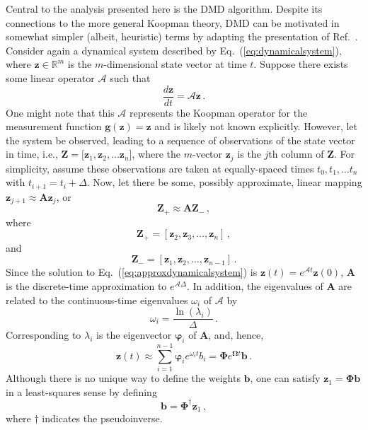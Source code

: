 \documentclass[review,number,sort&compress,12pt]{elsarticle}
\begin{document}
Central to the analysis presented here is the DMD algorithm.
Despite its connections to the more general Koopman theory, DMD can be motivated in somewhat simpler (albeit, heuristic) terms by adapting the presentation of Ref.~\cite{kutzbook}.
Consider again a dynamical system described by Eq.~(\ref{eq:dynamicalsystem}), where $\mathbf{z} \in \mathbb{R}^m$ is the $m$-dimensional state vector at time $t$.
Suppose there exists some linear operator $\mathcal{A}$ such that
\begin{equation}
 \frac{d \mathbf{z}}{dt} = \mathcal{A} \mathbf{z} \, .
 \label{eq:approxdynamicalsystem}
\end{equation}
One might note that this $\mathcal{A}$ represents the Koopman operator for the measurement function $\mathbf{g}(\mathbf{z}) = \mathbf{z}$ and is likely not known explicitly.
However, let the system be observed, leading to a sequence of observations of the state vector in time, i.e., $\mathbf{Z} = [\mathbf{z}_{1}, \mathbf{z}_{2}, \ldots \mathbf{z}_{n}$], where the $m$-vector $\mathbf{z}_{j}$ is the $j$th column of $\mathbf{Z}$. 
For simplicity, assume these observations are taken at equally-spaced times $t_0, t_1, \ldots t_n$ with $t_{i+1} = t_i + \Delta$.  
Now, let there be some, possibly approximate, linear mapping $\mathbf{z}_{j+1} \approx \mathbf{A}\mathbf{z}_{j}$, or \begin{equation}
   \mathbf{Z}_+ \approx \mathbf{A}\mathbf{Z}_- \, ,
   \label{eq:linearmapping}
\end{equation}
where
\begin{equation}
  \mathbf{Z}_+ =  [\mathbf{z}_{2},\mathbf{z}_{3}, \ldots,\mathbf{z}_{n}] \, ,
\end{equation}
and
\begin{equation}
 \mathbf{Z}_- =  [ \mathbf{z}_{1},\mathbf{z}_{2},\ldots, \mathbf{z}_{n-1}] \,  .                                                                                                           
\end{equation}
Since the solution to Eq.~(\ref{eq:approxdynamicalsystem}) is $\mathbf{z}(t) = e^{\mathcal{A}t}\mathbf{z}(0)$, $\mathbf{A}$ is the discrete-time approximation to $e^{\mathcal{A}\Delta}$.
In addition, the  eigenvalues of $\mathbf{A}$ are related to the continuous-time eigenvalues $\omega_i$ of $\mathcal{A}$ by 
\begin{equation}
 \omega_i = \frac{\ln{(\lambda_i)}}{\Delta} \, .
\end{equation}
Corresponding to $\lambda_i$ is the eigenvector $\boldsymbol{\varphi}_i$ of $\mathbf{A}$, and, hence,
\begin{equation}
 \mathbf{z}(t) \approx \sum^{n-1}_{i=1} \boldsymbol{\varphi}_i e^{\omega_i t} b_i = \boldsymbol{\Phi}e^{\boldsymbol{\Omega}t}\mathbf{b} \, . 
 \label{eq:dmdreconstruction}
\end{equation}
Although there is no unique way to define the weights $\mathbf{b}$, one can satisfy $\mathbf{z}_1 = \boldsymbol{\Phi}\mathbf{b}$  in a least-squares sense by defining
\begin{equation}
 \mathbf{b} = \boldsymbol{\Phi}^{\dagger} \mathbf{z}_1 \, ,
 \label{eq:amplitudes}
\end{equation}
where $\dagger$ indicates the pseudoinverse. 
\end{document}
